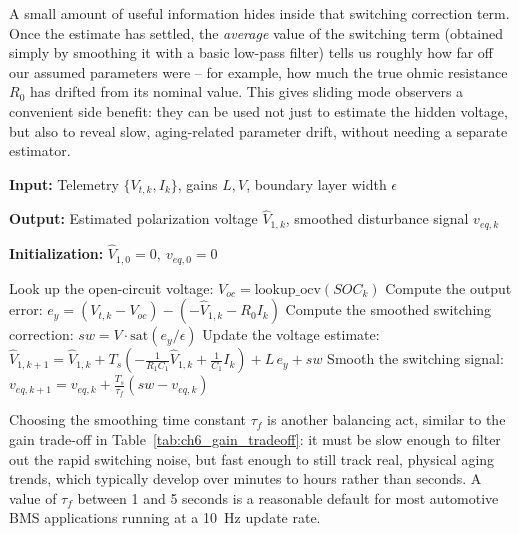 A small amount of useful information hides inside that switching correction term. Once the estimate has settled, the \emph{average} value of the switching term (obtained simply by smoothing it with a basic low-pass filter) tells us roughly how far off our assumed parameters were -- for example, how much the true ohmic resistance $R_0$ has drifted from its nominal value. This gives sliding mode observers a convenient side benefit: they can be used not just to estimate the hidden voltage, but also to reveal slow, aging-related parameter drift, without needing a separate estimator.

\begin{algorithm}[htbp]

\caption{Sliding Mode Observer with Chattering Suppression}
\label{alg:smo_chattering}

\footnotesize

\begin{algorithmic}[1]

\State \textbf{Input:} Telemetry $\{V_{t,k}, I_k\}$, gains $L, V$, boundary layer width $\epsilon$

\State \textbf{Output:} Estimated polarization voltage $\hat{V}_{1,k}$, smoothed disturbance signal $v_{eq,k}$

\State \textbf{Initialization:} $\hat{V}_{1,0}=0,\ v_{eq,0}=0$

    \State Look up the open-circuit voltage: $V_{oc} = \mathrm{lookup\_ocv}(SOC_k)$
    \State Compute the output error: $e_y = (V_{t,k}-V_{oc}) - (-\hat{V}_{1,k}-R_0I_k)$
    \State Compute the smoothed switching correction: $sw = V \cdot \text{sat}(e_y/\epsilon)$
    \State Update the voltage estimate:
    \State $\hat{V}_{1,k+1} = \hat{V}_{1,k} + T_s\left(-\frac{1}{R_1C_1}\hat{V}_{1,k} + \frac{1}{C_1}I_k\right) + L\,e_y + sw$
    \State Smooth the switching signal: $v_{eq,k+1} = v_{eq,k} + \frac{T_s}{\tau_f}(sw - v_{eq,k})$
\EndFor

\end{algorithmic}

\end{algorithm}

Choosing the smoothing time constant $\tau_f$ is another balancing act, similar to the gain trade-off in Table~\ref{tab:ch6_gain_tradeoff}: it must be slow enough to filter out the rapid switching noise, but fast enough to still track real, physical aging trends, which typically develop over minutes to hours rather than seconds. A value of $\tau_f$ between 1 and 5 seconds is a reasonable default for most automotive BMS applications running at a 10~Hz update rate.


